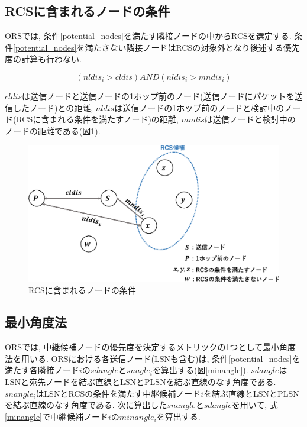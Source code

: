 \documentclass[10pt]{jreport}
\begin{document}
\subsection{RCSに含まれるノードの条件}
ORSでは, 条件\ref{potential_nodes}を満たす隣接ノードの中からRCSを選定する. 条件\ref{potential_nodes}を満たさない隣接ノードはRCSの対象外となり後述する優先度の計算も行わない.

\begin{equation}
	\label{potential_nodes}
	\left( nldis_i > cldis \right)   AND   \left( nldis_i > mndis_i \right) 
\end{equation}

$cldis$は送信ノードと送信ノードの1ホップ前のノード(送信ノードにパケットを送信したノード)との距離, $nldis$は送信ノードの1ホップ前のノードと検討中のノード(RCSに含まれる条件を満たすノード)の距離, $mndis$は送信ノードと検討中のノードの距離である(図\ref{fig:Condition_RCS}). 

\begin{figure}[!ht]
	\centering
	\includegraphics[width=150mm]{figures/Condition_RCS.eps}
	\caption{RCSに含まれるノードの条件}
	\label{fig:Condition_RCS}
\end{figure}


\subsection{最小角度法}
ORSでは, 中継候補ノードの優先度を決定するメトリックの1つとして最小角度法を用いる. ORSにおける各送信ノード(LSNも含む)は, 条件\ref{potential_nodes}を満たす各隣接ノード$i$の$sdangle$と$snagle_i$を算出する(図\ref{minangle}).
$sdangle$はLSNと宛先ノードを結ぶ直線とLSNとPLSNを結ぶ直線のなす角度である. $snangle_i$はLSNとRCSの条件を満たす中継候補ノード$i$を結ぶ直線とLSNとPLSNを結ぶ直線のなす角度である. 
次に算出した$snangle$と$sdangle$を用いて, 式\ref{minangle}で中継候補ノード$i$の$minangle_i$を算出する.
\end{document}

